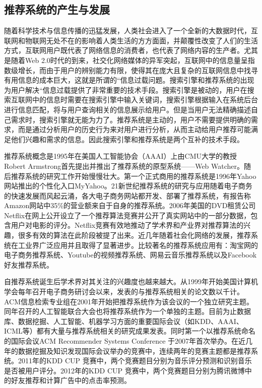 	\subsection{推荐系统的产生与发展}
	随着科学技术与信息传播的迅猛发展，人类社会进入了一个全新的大数据时代，互联网和物联网无处不在的影响着人类生活的方方面面，并颠覆性改变了人们的生活方式，互联网用户既代表了网络信息的消费者，也代表了网络内容的生产者。尤其是随着Web 2.0时代的到来，社交化网络媒体的异军突起，互联网中的信息量呈指数级增长，而由于用户的辨别能力有限，使得其在庞大且复杂的互联网信息中找寻有用信息的成本巨大，这就是所谓的“信息过载问题。搜索引擎和推荐系统的出现为用户解决“信息过载提供了非常重要的技术手段。搜索引擎是被动的，用户在搜索互联网中的信息时需要在搜索引擎中输入关键词，搜索引擎根据输入在系统后台进行信息匹配，将与用户查询相关的信息展示给用户。但是当用户无法精确描述自己需求时，搜索引擎就无能为力了。推荐系统是主动的，用户不需要提供明确的需求，而是通过分析用户的历史行为来对用户进行分析，从而主动给用户推荐可能满足他们兴趣和需求的信息。因此搜索引擎和推荐系统是两个互补的技术手段。

	推荐系统概念是1995年在美国人工智能协会（AAAI）上由CMU大学的教授Robert Armstrong首先提出并推出了推荐系统的原型系统——Web Watcher。随后推荐系统的研究工作开始慢慢壮大。第一个正式商用的推荐系统是1996年Yahoo网站推出的个性化入口MyYahoo。21新世纪推荐系统的研究与应用随着电子商务的快速发展而风起云涌，各大电子商务网站都开发、部署了推荐系统，有报告称Amazon网站中35\%的营业额来自于自身的推荐系统。2006年美国的DVD租赁公司Netflix在网上公开设立了一个推荐算法竞赛并公开了真实网站中的一部分数据，包含用户对电影的评分。Netflix竞赛有效地推动了学术界和产业界对推荐算法的兴趣，很多有效的算法在此阶段被提了出来。近几年随着社会化网络的发展，推荐系统在工业界广泛应用并且取得了显著进步。比较著名的推荐系统应用有：淘宝网的电子商务推荐系统、Youtube的视频推荐系统、网易云音乐推荐系统以及Facebook好友推荐系统。

	自推荐系统诞生后学术界对其关注的兴趣度也越来越大。从1999年开始美国计算机学会每年召开电子商务研讨会以来，发表的与推荐系统相关的论文数以千计。ACM信息检索专业组在2001年开始把推荐系统作为该会议的一个独立研究主题。同年召开的人工智能联合大会也将推荐系统作为一个单独的主题。目前为止数据库、数据挖掘、人工智能、机器学习方面的重要国际会议（如KDD、AAAI、ICML等）都有大量与推荐系统相关的研究成果发表。同时第一个以推荐系统命名的国际会议ACM Recommender Systems Conference 于2007年首次举办。在近几年的数据挖掘及知识发现国际会议举办的竞赛中，连续两年的竞赛主题都是推荐系统。2011年的KDD CUP 竞赛中，两个竞赛题目分别为音乐评分预测和识别音乐是否被用户评分。2012年的KDD CUP 竞赛中，两个竞赛题目分别为腾讯微博中的好友推荐和计算广告中的点击率预测。

